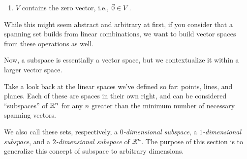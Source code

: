 \documentclass{ximera}
\begin{document}
\begin{exploration}
\begin{definition}
\begin{enumerate}
      \item $V$ contains the zero vector, i.e., $\vec{0}\in V$.
    \end{enumerate}

  \end{definition}

  While this might seem abstract and arbitrary at first, if you consider that a spanning set builds from linear combinations, we want to build vector spaces from these operations as well.

  Now, a subspace is essentially a vector space, but we contextualize it within a larger vector space.

Take a look back at the linear spaces we've defined so far: points, lines, and planes. Each of these are spaces in their own right, and can be considered ``subspaces'' of $\mathbb{R}^n$ for any $n$ greater than the minimum number of necessary spanning vectors.

\begin{center}
\end{center}
We also call these sets, respectively, a {\em $0$-dimensional
  subspace}, a {\em $1$-dimensional subspace}, and a {\em
  $2$-dimensional subspace} of\/ $\mathbb{R}^n$. The purpose of this section is
to generalize this concept of subspace to arbitrary dimensions.


\end{exploration}
\end{document}
